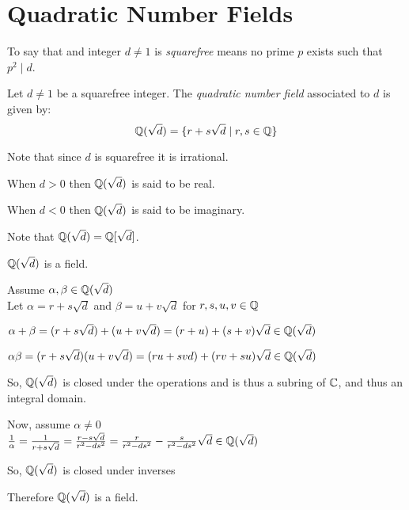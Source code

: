 \documentclass[letterpaper,12pt,fleqn]{article}
\newcommand{\sd}{\sqrt{d}}
\newcommand{\Qd}{\Q(\sd)}
\renewcommand{\a}{\alpha}
\renewcommand{\b}{\beta}
\begin{document}
\section*{Quadratic Number Fields}

\begin{definition}[Squarefree]
  To say that and integer $d\ne1$ is \emph{squarefree} means no prime $p$
  exists such that $p^2\mid d$.
\end{definition}

\begin{definition}
  Let $d\ne1$ be a squarefree integer. The \emph{quadratic number field}
  associated to $d$ is given by:
  \[\Qd=\{r+s\sd\mid r,s\in\Q\}\]

  Note that since $d$ is squarefree it is irrational.

  When $d>0$ then $\Qd$ is said to be real.
  
  When $d<0$ then $\Qd$ is said to be imaginary.
\end{definition}

Note that $\Qd=\Q[\sqrt{d}]$.

\begin{theorem}
  $\Qd$ is a field.
\end{theorem}

\begin{theproof}
  Assume $\a,\b\in\Qd$ \\
  Let $\a=r+s\sd$ and $\b=u+v\sd$ for $r,s,u,v\in\mathbb{Q}$

  $\a+\b=(r+s\sd)+(u+v\sd)=(r+u)+(s+v)\sd\in\Qd$

  $\a\b=(r+s\sd)(u+v\sd)=(ru+svd)+(rv+su)\sd\in\Qd$

  So, $\Qd$ is closed under the operations and is thus a subring of $\mathbb{C}$, and
  thus an integral domain.

  Now, assume $\a\ne0$ \\
  $\frac{1}{\a}=\frac{1}{r+s\sd}=\frac{r-s\sd}{r^2-ds^2}=
  \frac{r}{r^2-ds^2}-\frac{s}{r^2-ds^2}\sd\in\Qd$
  
  So, $\Qd$ is closed under inverses

  Therefore $\Qd$ is a field.
\end{theproof}
\end{document}
